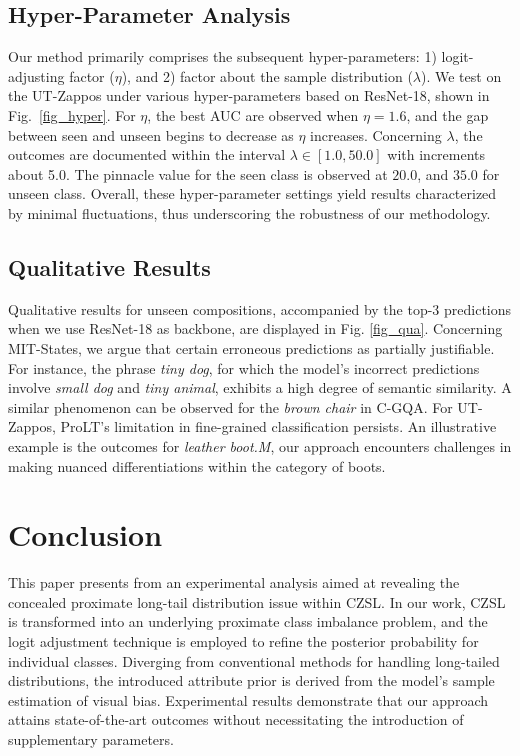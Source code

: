 \documentclass[letterpaper]{article} %
\theoremstyle{definition}
\begin{document}
\subsection{Hyper-Parameter Analysis}\label{subsec.hyper_parameters}
Our method primarily comprises the subsequent hyper-parameters: 1) logit-adjusting factor ($\eta$), and 2) factor about the sample distribution ($\lambda$). We test on the UT-Zappos under various hyper-parameters based on ResNet-18, shown in Fig.~\ref{fig_hyper}. For $\eta$, the best AUC are observed when $\eta=1.6$, and the gap between seen and unseen begins to decrease as $\eta$ increases. Concerning $\lambda$, the outcomes are documented within the interval $\lambda \in [1.0, 50.0]$ with increments about 5.0. The pinnacle value for the seen class is observed at $20.0$, and $35.0$ for unseen class. Overall, these hyper-parameter settings yield results characterized by minimal fluctuations, thus underscoring the robustness of our methodology.

\subsection{Qualitative Results} \label{subsec.qualitative}
Qualitative results for unseen compositions, accompanied by the top-3 predictions when we use ResNet-18 as backbone, are displayed in Fig. \ref{fig_qua}. Concerning MIT-States, we argue that certain erroneous predictions as partially justifiable. For instance, the phrase \textit{tiny dog}, for which the model's incorrect predictions involve \textit{small dog} and \textit{tiny animal}, exhibits a high degree of semantic similarity. A similar phenomenon can be observed for the \textit{brown chair} in C-GQA. For UT-Zappos, ProLT's limitation in fine-grained classification persists. An illustrative example is the outcomes for \textit{leather boot.M}, our approach encounters challenges in making nuanced differentiations within the category of boots.

\section{Conclusion}
This paper presents from an experimental analysis aimed at revealing the concealed proximate long-tail distribution issue within CZSL. In our work, CZSL is transformed into an underlying proximate class imbalance problem, and the logit adjustment technique is employed to refine the posterior probability for individual classes. Diverging from conventional methods for handling long-tailed distributions, the introduced attribute prior is derived from the model's sample estimation of visual bias. Experimental results demonstrate that our approach attains state-of-the-art outcomes without necessitating the introduction of supplementary parameters.
\end{document}
